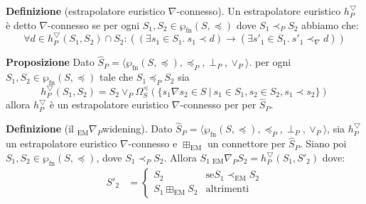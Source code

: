 \noindent\textbf{Definizione} (estrapolatore euristico \(\nabla\)-connesso). Un estrapolatore euristico \(h_{P}^{\bigtriangledown}\)
è detto \(\nabla\)-connesso se per ogni \(S_1, S_2\in\wp_{\textrm{fn}}(S, \preceq)\) dove \(S_1\prec_P S_2\) abbiamo che:
\[\forall d \in h_{P}^{\bigtriangledown}(S_1, S_2)\cap S_2:((\exists s_1\in S_1.\ s_1\prec d)\longrightarrow (\exists s'_1\in S_1.\ s'_1 \prec_{\nabla} d))\]

\noindent\textbf{Proposizione} Dato \(\hat{S}_P = \langle \wp_{\textrm{fn}}(S, \preceq),\preceq_P, \perp_P ,\vee_P\rangle\). per ogni \(S_1, S_2\in\wp_{\textrm{fn}}(S, \preceq)\) tale che \(S_1\preceq_P S_2\) sia
\[h_{P}^{\bigtriangledown}(S_1, S_2) = S_2\vee_P\Omega_{S}^{\preceq}(\lbrace s_1\nabla s_2 \in S\ \vert\ s_1\in S_1, s_2\in S_2, s_1\prec s_2 \rbrace)\]
allora \(h_{P}^{\bigtriangledown}\) è un estrapolatore euristico \(\nabla\)-connesso per per \(\hat{S}_P\).

\noindent\textbf{Definizione} (il \(_{\textrm{EM}}\nabla_P\)widening). Dato \(\hat{S}_P = \langle \wp_{\textrm{fn}}(S, \preceq),\preceq_P, \perp_P ,\vee_P\rangle\), sia \(h_{P}^{\bigtriangledown}\) un estrapolatore euristico \(\nabla\)-connesso e \(\boxplus_{\textrm{EM}}\) un connettore per \(\hat{S}_P\). Siano poi \(S_1, S_2\in\wp_{\textrm{fn}}(S, \preceq)\), dove \(S_1\prec_P S_2\). Allora \(S_1\ _{\textrm{EM}}\nabla_P S_2 = h_{P}^{\bigtriangledown}(S_1, S'_2)\) dove:
	\begin{align*}
	S'_2 &=  \begin{cases}
				S_2 &\textrm{se} S_1\prec_{\textrm{EM}} S_2 \\
				S_1\boxplus_{\textrm{EM}} S_2 &\textrm{altrimenti}
				\end{cases}
	\end{align*}
